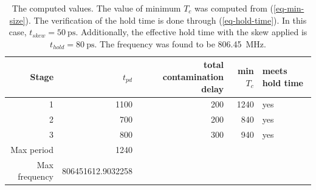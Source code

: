 \documentclass[hidelinks, 12pt]{article}
\begin{document}
\begin{table}[htbp]
\caption{\label{tab-q2}The computed values. The value of minimum \(T_{c}\) was computed from (\ref{eq-min-size}). The verification of the hold time is done through (\ref{eq-hold-time}). In this case, \(t_{skew}=\qty{50}{\pico\s}\). Additionally, the effective hold time with the skew applied is \(t_{hold} = \qty{80}{\pico\s}\). The frequency was found to be \qty{806.45}{\mega\hertz}.}
\centering
\begin{tabular}{rrrrl}
Stage & \(t_{pd}\) & total contamination delay & min \(T_{c}\) & meets hold time\\
\hline
1 & 1100 & 200 & 1240 & yes\\
2 & 700 & 200 & 840 & yes\\
3 & 800 & 300 & 940 & yes\\
\hline
Max period & 1240 &  &  & \\
Max frequency & 806451612.9032258 &  &  & \\
\end{tabular}
\end{table}
\end{document}
